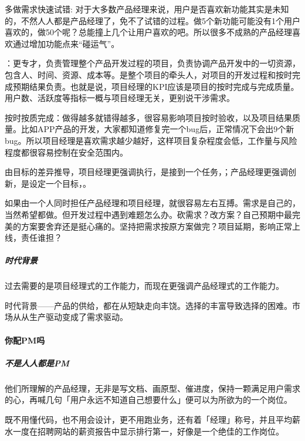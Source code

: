 \documentclass[letterpaper,11pt,english]{sphinxmanual}
\begin{document}
多做需求快速试错:
对于大多数产品经理来说，用户是否喜欢新功能其实是未知的，不然人人都是产品经理了，免不了试错的过程。做5个新功能可能没有1个用户喜欢的，做50个呢？总能撞上几个让用户喜欢的吧。所以很多不成熟的产品经理喜欢通过增加功能点来“碰运气”。

：更专才，负责管理整个产品开发过程的项目，负责协调产品开发中的一切资源，包含人、时间、资源、成本等。是整个项目的牵头人，对项目的开发过程和按时完成预期结果负责。也就是说，项目经理的KPI应该是项目的按时完成与完成质量。用户数、活跃度等指标一概与项目经理无关，更别说干涉需求。

按时按质完成：做得越多就错得越多，很容易影响项目按时验收，以及项目结果质量。比如APP产品的开发，大家都知道修复完一个bug后，正常情况下会出9个新bug。所以项目经理是喜欢需求越少越好，这样项目复杂程度会低，工作量与风险程度都很容易控制在安全范围内。

由目标的差异推导，项目经理更强调执行，是接到一个任务，；产品经理更强调创新，是设定一个目标，。

如果由一个人同时担任产品经理和项目经理，就很容易左右互搏。需求是自己的，当然希望都做。但开发过程中遇到难题怎么办。砍需求？改方案？自己预期中最完美的方案要舍弃还是挺心痛的。坚持把需求按原方案做完？项目延期，影响正常上线，责任谁担？


\subparagraph{时代背景}
\label{\detokenize{chapter_introduction/PM:id7}}
过去需要的是项目经理式的工作能力，而现在更强调产品经理式的工作能力。

时代背景——产品的供给，都在从短缺走向丰饶。选择的丰富导致选择的困难。市场从从生产驱动变成了需求驱动。


\paragraph{你配PM吗}
\label{\detokenize{chapter_introduction/PM:pm}}

\subparagraph{不是人人都是PM}
\label{\detokenize{chapter_introduction/PM:id8}}
他们所理解的产品经理，无非是写文档、画原型、催进度，保持一颗满足用户需求的心，再喊几句「用户永远不知道自己想要什么」便可以为所欲为的一个岗位。

既不用懂代码，也不用会设计，更不用跑业务，还有着「经理」称号，并且平均薪水一度在招聘网站的薪资报告中显示排行第一，好像是一个绝佳的工作岗位。%
\begin{footnote}[132]\sphinxAtStartFootnote
{}
%
\end{footnote}
\end{document}
